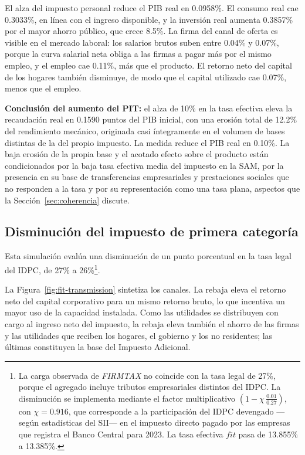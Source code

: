 \documentclass[11pt]{article}
\begin{document}
El alza del impuesto personal reduce el PIB real en 0.0958\%. El consumo real cae 0.3033\%, en línea con el ingreso disponible, y la inversión real aumenta 0.3857\% por el mayor ahorro público, que crece 8.5\%. La firma del canal de oferta es visible en el mercado laboral: los salarios brutos suben entre 0.04\% y 0.07\%, porque la curva salarial neta obliga a las firmas a pagar más por el mismo empleo, y el empleo cae 0.11\%, más que el producto. El retorno neto del capital de los hogares también disminuye, de modo que el capital utilizado cae 0.07\%, menos que el empleo.

\textbf{Conclusión del aumento del PIT:} el alza de 10\% en la tasa efectiva eleva la recaudación real en 0.1590 puntos del PIB inicial, con una erosión total de 12.2\% del rendimiento mecánico, originada casi íntegramente en el volumen de bases distintas de la del propio impuesto. La medida reduce el PIB real en 0.10\%. La baja erosión de la propia base y el acotado efecto sobre el producto están condicionados por la baja tasa efectiva media del impuesto en la SAM, por la presencia en su base de transferencias empresariales y prestaciones sociales que no responden a la tasa y por su representación como una tasa plana, aspectos que la Sección~\ref{sec:coherencia} discute.

\subsection{Disminución del impuesto de primera categoría}

Esta simulación evalúa una disminución de un punto porcentual en la tasa legal del IDPC, de 27\% a 26\%\footnote{La carga observada de \textit{FIRMTAX} no coincide con la tasa legal de 27\%, porque el agregado incluye tributos empresariales distintos del IDPC. La disminución se implementa mediante el factor multiplicativo \(\left(1 - \chi\,\frac{0.01}{0.27}\right)\), con \(\chi=0.916\), que corresponde a la participación del IDPC devengado ---según estadísticas del SII--- en el impuesto directo pagado por las empresas que registra el Banco Central para 2023. La tasa efectiva $fit$ pasa de 13.855\% a 13.385\%.}.

La Figura~\ref{fig:fit-transmission} sintetiza los canales. La rebaja eleva el retorno neto del capital corporativo para un mismo retorno bruto, lo que incentiva un mayor uso de la capacidad instalada. Como las utilidades se distribuyen con cargo al ingreso neto del impuesto, la rebaja eleva también el ahorro de las firmas y las utilidades que reciben los hogares, el gobierno y los no residentes; las últimas constituyen la base del Impuesto Adicional.
\end{document}

